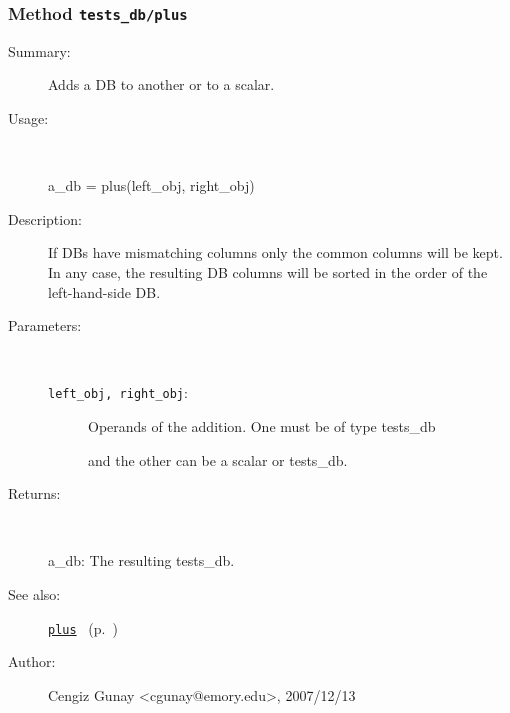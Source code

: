 \subsubsection[Method \texttt{plus}]{Method \texttt{tests\_db/plus}}%
%
\label{ref_tests_db__plus}%
\hypertarget{ref_tests_db__plus}{}%
\begin{description}
\item[Summary:]Adds a DB to another or to a scalar.
%
\item[Usage:]~%
\begin{lyxcode}%
a\_db = plus(left\_obj, right\_obj)
%
\end{lyxcode}%
%
\item[Description:]%
If DBs have mismatching columns only the common columns will be kept.
 In any case, the resulting DB columns will be sorted in the order of the
 left-hand-side DB.
\item[Parameters:]~
\begin{description}%
\item[\texttt{left\_obj, right\_obj}:]
 Operands of the addition. One must be of type tests\_db

and the other can be a scalar or tests\_db.
\end{description}%
%
\item[Returns:
]~

	a\_db: The resulting tests\_db.
%
%
\item[See also:]%
\hyperlink{ref_plus}{\texttt{plus}}%
\ (p.~\pageref{ref_plus})%
%
%
\item[Author:]%
Cengiz Gunay <cgunay@emory.edu>, 2007/12/13
%
\end{description}
\methodline%
